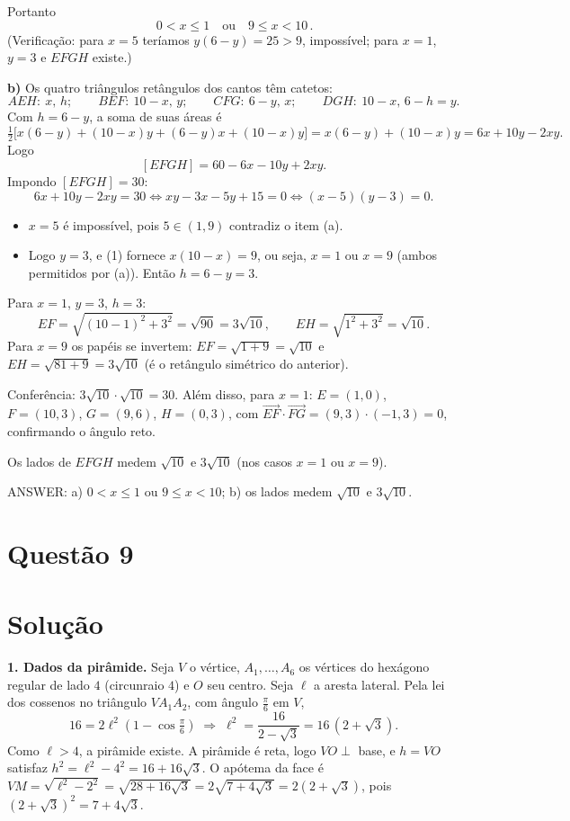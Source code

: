\documentclass{article}%
\begin{document}
Portanto
\[
\boxed{\,0<x\le 1\quad\text{ou}\quad 9\le x<10\,}.
\]
(Verificação: para $x=5$ teríamos $y(6-y)=25>9$, impossível; para $x=1$, $y=3$ e $EFGH$ existe.)

\textbf{b)} Os quatro triângulos retângulos dos cantos têm catetos:
\[
AEH:\ x,\,h;\qquad BEF:\ 10-x,\,y;\qquad CFG:\ 6-y,\,x;\qquad DGH:\ 10-x,\,6-h=y .
\]
Com $h=6-y$, a soma de suas áreas é
\[
\tfrac12\big[x(6-y)+(10-x)y+(6-y)x+(10-x)y\big]=x(6-y)+(10-x)y=6x+10y-2xy .
\]
Logo
\[
[EFGH]=60-6x-10y+2xy .
\]
Impondo $[EFGH]=30$:
\[
6x+10y-2xy=30 \iff xy-3x-5y+15=0 \iff (x-5)(y-3)=0 .
\]
\begin{itemize}
\item $x=5$ é impossível, pois $5\in(1,9)$ contradiz o item (a).
\item Logo $y=3$, e (1) fornece $x(10-x)=9$, ou seja, $x=1$ ou $x=9$ (ambos permitidos por (a)). Então $h=6-y=3$.
\end{itemize}

Para $x=1$, $y=3$, $h=3$:
\[
EF=\sqrt{(10-1)^2+3^2}=\sqrt{90}=3\sqrt{10},\qquad EH=\sqrt{1^2+3^2}=\sqrt{10}.
\]
Para $x=9$ os papéis se invertem: $EF=\sqrt{1+9}=\sqrt{10}$ e $EH=\sqrt{81+9}=3\sqrt{10}$ (é o retângulo simétrico do anterior).

Conferência: $3\sqrt{10}\cdot\sqrt{10}=30$. Além disso, para $x=1$: $E=(1,0)$, $F=(10,3)$, $G=(9,6)$, $H=(0,3)$, com $\overrightarrow{EF}\cdot\overrightarrow{FG}=(9,3)\cdot(-1,3)=0$, confirmando o ângulo reto.

Os lados de $EFGH$ medem $\sqrt{10}$ e $3\sqrt{10}$ (nos casos $x=1$ ou $x=9$).

ANSWER: a) $0<x\le 1$ ou $9\le x<10$; b) os lados medem $\sqrt{10}$ e $3\sqrt{10}$.%
\newpage%
\section*{Questão 9}

\section*{Solução}

\textbf{1. Dados da pirâmide.} Seja $V$ o vértice, $A_1,\dots,A_6$ os vértices do hexágono regular de lado $4$ (circunraio $4$) e $O$ seu centro. Seja $\ell$ a aresta lateral. Pela lei dos cossenos no triângulo $VA_1A_2$, com ângulo $\frac{\pi}{6}$ em $V$,
\[
16=2\ell^2\left(1-\cos\tfrac{\pi}{6}\right)\;\Rightarrow\;\ell^2=\frac{16}{2-\sqrt3}=16\,(2+\sqrt3).
\]
Como $\ell>4$, a pirâmide existe. A pirâmide é reta, logo $VO\perp$ base, e $h=VO$ satisfaz $h^2=\ell^2-4^2=16+16\sqrt3$. O apótema da face é $VM=\sqrt{\ell^2-2^2}=\sqrt{28+16\sqrt3}=2\sqrt{7+4\sqrt3}=2(2+\sqrt3)$, pois $(2+\sqrt3)^2=7+4\sqrt3$.
\end{document}
